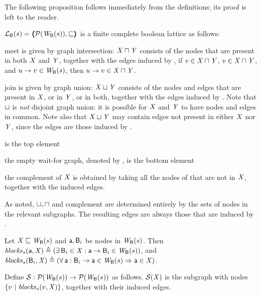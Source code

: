 The following proposition follows immediately from the definitions; its proof is left to the reader.
\begin{proposition} \label{prop:isALattice}
$\mathcal{L}_{\mathsf{B}}({s}) = \langle \hspace{-0.34em} \langle \hspace{-0.34em} \langle  \mathcal{P}(\mathit{W}_{\mathsf{B}}({s})), \sqsubseteq  \rangle \hspace{-0.34em} \rangle \hspace{-0.34em} \rangle$ is a finite complete boolean lattice as follows:
\be

\item meet is given by graph intersection: 
$\mathit{X} \sqcap \mathit{Y}$ consists of the nodes that are present in both $\mathit{X}$ and $\mathit{Y}$, together with the edges induced by , 
\ie if $\mathit{v} \in \mathit{X} \sqcap \mathit{Y}$, $\mathit{v} \in \mathit{X} \sqcap \mathit{Y}$, and $u \rightarrow v \in  \mathit{W}_{\mathsf{B}}({s})$, then $u \rightarrow v \in  \mathit{X} \sqcap \mathit{Y}$.

\item join is given by graph union: $\mathit{X} \sqcup \mathit{Y}$ consists of the nodes and edges that are present in $\mathit{X}$, or in $\mathit{Y}$, or in both, together with 
 the edges induced by .
 Note that $\sqcup$ is \emph{not} disjoint graph union: 
it is possible for $\mathit{X}$ and $\mathit{Y}$ to have nodes and edges in common. Note also that $\mathit{X} \sqcup \mathit{Y}$ may contain edges not present in either $\mathit{X}$ nor $\mathit{Y}$,
since the edges are those induced by . 

\item {}  is the top element 

\item  the empty wait-for graph, denoted by \ewfg, is the bottom element

\item the complement \compl{\XS} of $\mathit{X}$ is obtained by taking all the nodes of  that are not in $\mathit{X}$, together with the induced edges.
\ee
\end{proposition}
%
As noted, $\sqcup, \sqcap$ and complement are determined entirely by the sets of nodes in the relevant subgraphs. The resulting edges are always those
that are induced by .



\begin{definition} \label{defn:blocks} 
Let $\mathit{X} \sqsubseteq \mathit{W}_{\mathsf{B}}({s})$ and $\mathsf{a}, \mathsf{B}_i$ be nodes in $\mathit{W}_{\mathsf{B}}({s})$. Then 
$\mathit{blocks}_{s}(\mathsf{a}, \mathit{X}) \triangleq (\exists\, \mathsf{B}_i \in \mathit{X} : \mathsf{a} \rightarrow \mathsf{B}_i \in \mathit{W}_{\mathsf{B}}({s}))$, and 
$\mathit{blocks}_{s}(\mathsf{B}_i, \mathit{X}) \triangleq (\forall\, \mathsf{a} : \mathsf{B}_i \rightarrow \mathsf{a} \in \mathit{W}_{\mathsf{B}}({s}) \Rightarrow \mathsf{a} \in \mathit{X})$.
\end{definition}

\begin{definition}[$\SFsymb$]  \label{defn:scFix} 
Define $\mathcal{S}: \mathcal{P}(\mathit{W}_{\mathsf{B}}({s})) \to \mathcal{P}(\mathit{W}_{\mathsf{B}}({s}))$ as follows.
$\mathcal{S}(\mathit{X})$ is the subgraph with nodes $\{ v ~|~ \mathit{blocks}_{s}(v, \mathit{X})  \}$, together with their induced edges.
\end{definition}


